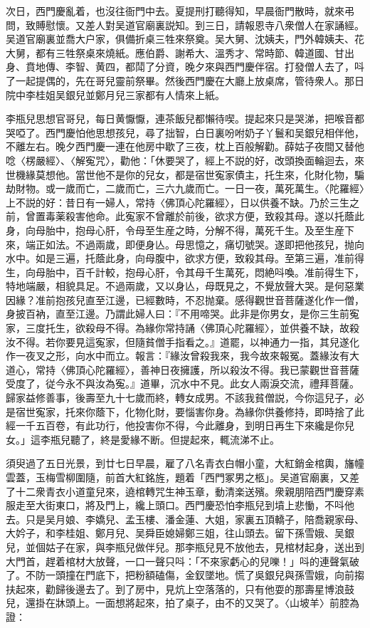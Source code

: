 次日，西門慶亂着，也沒往衙門中去。夏提刑打聽得知，早晨衙門散時，就來弔問，致賻慰懷。又差人對吴道官廟裏説知。到三日，請報恩寺八衆僧人在家誦經。吴道官廟裏並喬大户家，俱備折桌三牲來祭奠。吴大舅、沈姨夫，門外韓姨夫、花大舅，都有三牲祭桌來燒紙。應伯爵、謝希大、溫秀才、常時節、韓道國、甘出身、賁地傳、李智、黄四，都鬦了分資，晚夕來與西門慶伴宿。打發僧人去了，呌了一起提偶的，先在哥兒靈前祭畢。然後西門慶在大廳上放桌席，管待衆人。那日院中李桂姐吴銀兒並鄭月兒三家都有人情來上紙。

李瓶兒思想官哥兒，每日黄懨懨，連茶飯兒都懶待喫。提起來只是哭涕，把喉音都哭啞了。西門慶怕他思想孩兒，尋了拙智，白日裏吩咐奶子丫鬟和吴銀兒相伴他，不離左右。晚夕西門慶一連在他房中歇了三夜，枕上百般解勸。薛姑子夜間又替他唸〈楞嚴經〉、〈解寃咒〉，勸他：「休要哭了，經上不説的好，改頭換面輪迴去，來世機緣莫想他。當世他不是你的兒女，都是宿世寃家債主，托生來，化財化物，騙劫財物。或一歲而亡，二歲而亡，三六九歲而亡。一日一夜，萬死萬生。〈陀羅經〉上不説的好：昔日有一婦人，常持〈佛頂心陀羅經〉，日以供養不缺。乃於三生之前，曾置毒薬殺害他命。此寃家不曾離於前後，欲求方便，致殺其母。遂以托蔭此身，向母胎中，抱母心肝，令母至生産之時，分解不得，萬死千生。及至生産下來，端正如法。不過兩歲，即便身亾。母思憶之，痛切號哭。遂即把他孩兒，抛向水中。如是三遍，托蔭此身，向母腹中，欲求方便，致殺其母。至第三遍，准前得生，向母胎中，百千計較，抱母心肝，令其母千生萬死，悶絶呌喚。准前得生下，特地端嚴，相貌具足。不過兩歲，又以身亾，母既見之，不覺放聲大哭。是何惡業因緣？准前抱孩兒直至江邊，已經數時，不忍抛棄。感得觀世音菩薩遂化作一僧，身披百衲，直至江邊。乃謂此婦人曰：『不用啼哭。此非是你男女，是你三生前寃家，三度托生，欲殺母不得。為緣你常持誦〈佛頂心陀羅經〉，並供養不缺，故殺汝不得。若你要見這寃家，但隨貧僧手指看之。』道罷，以神通力一指，其兒遂化作一夜叉之形，向水中而立。報言：『緣汝曾殺我來，我今故來報冤。蓋緣汝有大道心，常持〈佛頂心陀羅經〉，善神日夜擁護，所以殺汝不得。我已蒙觀世音菩薩受度了，従今永不與汝為寃。』道畢，沉水中不見。此女人兩淚交流，禮拜菩薩。歸家益修善事，後壽至九十七歲而終，轉女成男。不該我貧僧説，今你這兒子，必是宿世寃家，托來你蔭下，化物化財，要惱害你身。為緣你供養修持，即時捨了此經一千五百卷，有此功行，他投害你不得，今此離身，到明日再生下來纔是你兒女。」這李瓶兒聽了，終是愛緣不断。但提起來，輒流涕不止。

須臾過了五日光景，到廿七日早晨，雇了八名青衣白帽小童，大紅銷金棺輿，旛幢雲蓋，玉梅雪柳圍隨，前首大紅銘旌，題着「西門冢男之柩」。吴道官廟裏，又差了十二衆青衣小道童兒來，遶棺轉咒生神玉章，動清楽送殯。衆親朋陪西門慶穿素服走至大街東口，將及門上，纔上頭口。西門慶恐怕李瓶兒到墳上悲慟，不呌他去。只是吴月娘、李嬌兒、孟玉樓、潘金蓮、大姐，家裏五頂轎子，陪喬親家母、大妗子，和李桂姐、鄭月兒、吴舜臣媳婦鄭三姐，往山頭去。留下孫雪娥、吴銀兒，並個姑子在家，與李瓶兒做伴兒。那李瓶兒見不放他去，見棺材起身，送出到大門首，趕着棺材大放聲，一口一聲只呌：「不來家虧心的兒嚛！」呌的連聲氣破了。不防一頭撞在門底下，把粉額磕傷，金釵墜地。慌了吳銀兒與孫雪娥，向前搊扶起來，勸歸後邊去了。到了房中，見炕上空落落的，只有他耍的那壽星博浪鼓兒，還掛在牀頭上。一面想將起來，拍了桌子，由不的又哭了。〈山坡羊〉前腔為證：

